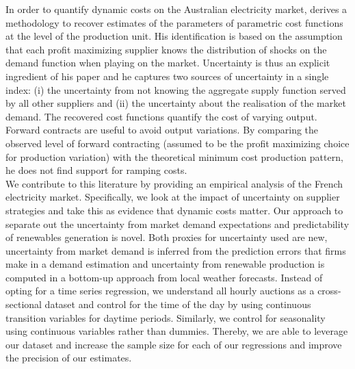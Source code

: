 In order to quantify dynamic costs on the Australian electricity market, \cite{wolak2007quantifying} derives a methodology to recover estimates of the parameters of parametric cost functions at the level of the production unit. His identification is based on the assumption that each profit maximizing supplier knows the distribution of shocks on the demand function when playing on the market. Uncertainty is thus an explicit ingredient of his paper and he captures two sources of uncertainty in a single index: (i) the uncertainty from not knowing the aggregate supply function served by all other suppliers and (ii) the uncertainty about the realisation of the market demand.  The recovered cost functions quantify the cost of varying output. Forward contracts are useful to avoid output variations. By comparing the observed  level of forward contracting (assumed to be the profit maximizing choice for production variation) with the theoretical minimum cost production pattern, he %
does not find support for ramping costs.\\

We contribute to this literature by providing an empirical analysis of the French electricity market.
Specifically, we look at the impact of uncertainty on supplier strategies and take this as evidence that dynamic costs matter. 
 Our approach to separate out the uncertainty from market demand expectations and predictability of renewables generation is novel. Both proxies for uncertainty used are new, uncertainty from market demand is inferred from the prediction errors that firms make in a demand estimation and uncertainty from renewable production is computed in a bottom-up approach from local weather forecasts.
Instead of opting for a time series regression, we understand all hourly auctions as a cross-sectional dataset and control for the time of the day by using continuous transition variables for daytime periods. Similarly, we control for seasonality using continuous variables rather than dummies.  Thereby, %
we are able to leverage our dataset and increase the sample size for each of our regressions and improve the precision of our estimates. \\



